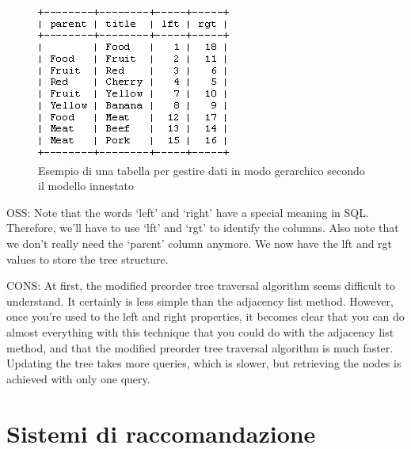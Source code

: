 \begin{figure}[!htbp]
    \centering
	\includegraphics[scale=1]{images/Nested_Tree_Model_table.PNG}
	\caption{Esempio di una tabella per gestire dati in modo gerarchico secondo il modello innestato}
\end{figure}

OSS: Note that the words ‘left’ and ‘right’ have a special meaning in SQL. Therefore, we’ll have to use ‘lft’ and ‘rgt’ to identify 
the columns. Also note that we don’t really need the ‘parent’ column anymore. We now have the lft and rgt values to store the tree 
structure.

CONS: At first, the modified preorder tree traversal algorithm seems difficult to understand. It certainly is less simple than the 
adjacency list method. However, once you’re used to the left and right properties, it becomes clear that you can do almost everything 
with this technique that you could do with the adjacency list method, and that the modified preorder tree traversal algorithm is much 
faster. Updating the tree takes more queries, which is slower, but retrieving the nodes is achieved with only one query.


\section{Sistemi di raccomandazione}